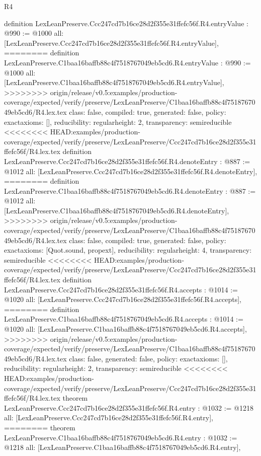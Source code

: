 \begin{lexlean}{R4}
\begin{coremodule}
{{{{{{{{{{{{{{definition LexLeanPreserve.Ccc247cd7b16ce28d2f355e31ffefc56f.R4.entryValue : @990 := @1000 {
  all: [LexLeanPreserve.Ccc247cd7b16ce28d2f355e31ffefc56f.R4.entryValue],
========
definition LexLeanPreserve.C1baa16baffb88c4f7518767049eb5cd6.R4.entryValue : @990 := @1000 {
  all: [LexLeanPreserve.C1baa16baffb88c4f7518767049eb5cd6.R4.entryValue],
>>>>>>>> origin/release/v0.5:examples/production-coverage/expected/verify/preserve/LexLeanPreserve/C1baa16baffb88c4f7518767049eb5cd6/R4.lex.tex
  class: false,
  compiled: true,
  generated: false,
  policy: exact{axioms: []},
  reducibility: regular{height: 2},
  transparency: semireducible
}
<<<<<<<< HEAD:examples/production-coverage/expected/verify/preserve/LexLeanPreserve/Ccc247cd7b16ce28d2f355e31ffefc56f/R4.lex.tex
definition LexLeanPreserve.Ccc247cd7b16ce28d2f355e31ffefc56f.R4.denoteEntry : @887 := @1012 {
  all: [LexLeanPreserve.Ccc247cd7b16ce28d2f355e31ffefc56f.R4.denoteEntry],
========
definition LexLeanPreserve.C1baa16baffb88c4f7518767049eb5cd6.R4.denoteEntry : @887 := @1012 {
  all: [LexLeanPreserve.C1baa16baffb88c4f7518767049eb5cd6.R4.denoteEntry],
>>>>>>>> origin/release/v0.5:examples/production-coverage/expected/verify/preserve/LexLeanPreserve/C1baa16baffb88c4f7518767049eb5cd6/R4.lex.tex
  class: false,
  compiled: true,
  generated: false,
  policy: exact{axioms: [Quot.sound, propext]},
  reducibility: regular{height: 4},
  transparency: semireducible
}
<<<<<<<< HEAD:examples/production-coverage/expected/verify/preserve/LexLeanPreserve/Ccc247cd7b16ce28d2f355e31ffefc56f/R4.lex.tex
definition LexLeanPreserve.Ccc247cd7b16ce28d2f355e31ffefc56f.R4.accepts : @1014 := @1020 {
  all: [LexLeanPreserve.Ccc247cd7b16ce28d2f355e31ffefc56f.R4.accepts],
========
definition LexLeanPreserve.C1baa16baffb88c4f7518767049eb5cd6.R4.accepts : @1014 := @1020 {
  all: [LexLeanPreserve.C1baa16baffb88c4f7518767049eb5cd6.R4.accepts],
>>>>>>>> origin/release/v0.5:examples/production-coverage/expected/verify/preserve/LexLeanPreserve/C1baa16baffb88c4f7518767049eb5cd6/R4.lex.tex
  class: false,
  generated: false,
  policy: exact{axioms: []},
  reducibility: regular{height: 2},
  transparency: semireducible
}
<<<<<<<< HEAD:examples/production-coverage/expected/verify/preserve/LexLeanPreserve/Ccc247cd7b16ce28d2f355e31ffefc56f/R4.lex.tex
theorem LexLeanPreserve.Ccc247cd7b16ce28d2f355e31ffefc56f.R4.entry : @1032 := @1218 {
  all: [LexLeanPreserve.Ccc247cd7b16ce28d2f355e31ffefc56f.R4.entry],
========
theorem LexLeanPreserve.C1baa16baffb88c4f7518767049eb5cd6.R4.entry : @1032 := @1218 {
  all: [LexLeanPreserve.C1baa16baffb88c4f7518767049eb5cd6.R4.entry],
}}}}}}}}}}}}}}}}}}}
\end{coremodule}
\end{lexlean}
